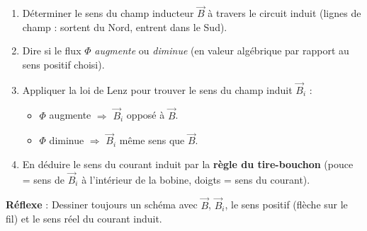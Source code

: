 \documentclass[11pt]{article}
\newcommand{\cle}[1]{{\popxbold\color{popdark}#1}}
\begin{document}
\begin{methode}
\begin{enumerate}
\item Déterminer le sens du champ inducteur $\vec{B}$ à travers le circuit induit (lignes de champ : sortent du Nord, entrent dans le Sud).
\item Dire si le flux $\Phi$ \emph{augmente} ou \emph{diminue} (en valeur algébrique par rapport au sens positif choisi).
\item Appliquer la loi de Lenz pour trouver le sens du \cle{champ induit} $\vec{B}_i$ :
\begin{itemize}
\item $\Phi$ augmente $\Rightarrow$ $\vec{B}_i$ opposé à $\vec{B}$.
\item $\Phi$ diminue $\Rightarrow$ $\vec{B}_i$ même sens que $\vec{B}$.
\end{itemize}
\item En déduire le sens du courant induit par la \textbf{règle du tire-bouchon} (pouce = sens de $\vec{B}_i$ à l'intérieur de la bobine, doigts = sens du courant).
\end{enumerate}
\textbf{Réflexe} : Dessiner toujours un schéma avec $\vec{B}$, $\vec{B}_i$, le sens positif (flèche sur le fil) et le sens réel du courant induit.
\end{methode}
\end{document}

